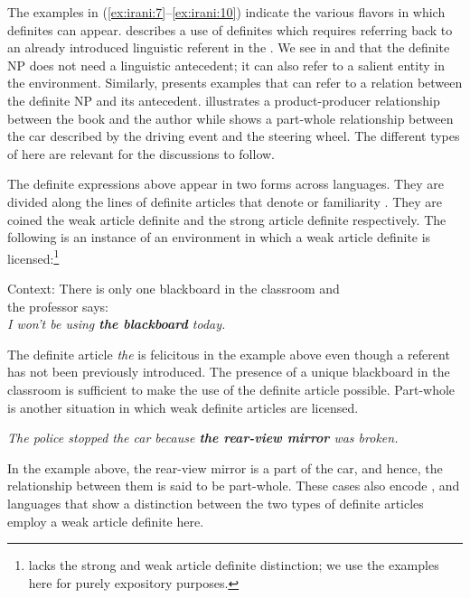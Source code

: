 \documentclass[output=paper,
modfonts
]{langscibook}
\begin{document}
The examples in (\ref{ex:irani:7}--\ref{ex:irani:10}) indicate the various flavors in which definites can appear.  describes a use of definites which requires referring back to an already introduced linguistic referent in the . We see in  and  that the definite NP does not need a linguistic antecedent; it can also refer to a salient entity in the environment. Similarly,  presents examples that can refer to a relation between the definite NP and its antecedent.  illustrates a product-producer  relationship between the book and the author while  shows a part-whole relationship between the car described by the driving event and the steering wheel. The different types of  here are relevant for the discussions to follow.

The definite expressions above appear in two forms across languages. They are divided along the lines of definite articles that denote  or familiarity \citep{Schwarz2009,Schwarz2013}. They are coined the weak article definite and the strong article definite respectively. The following is an instance of an environment in which a weak article definite is licensed:\footnote{ lacks the strong and weak article definite distinction; we use the examples here for purely expository purposes.}

\begin{exe}
\ex\label{ex:irani:11} Context: There is only one blackboard in the classroom and\\
the professor says:\\
\textit{I won't be using \textbf{the blackboard} today.}
\end{exe}

The definite article \textit{the} is felicitous in the example above even though a referent has not been previously introduced. The presence of a unique blackboard in the classroom is sufficient to make the use of the definite article possible. Part-whole  is another situation in which weak definite articles are licensed. 

\begin{exe} 
\ex\label{ex:irani:12} \textit{The police stopped the car because \textbf{the rear-view mirror} was broken.}
\end{exe} 

In the example above, the rear-view mirror is a part of the car, and hence, the relationship between them is said to be part-whole. These cases also encode , and languages that show a distinction between the two types of definite articles employ a weak article definite here. 
\end{document}
